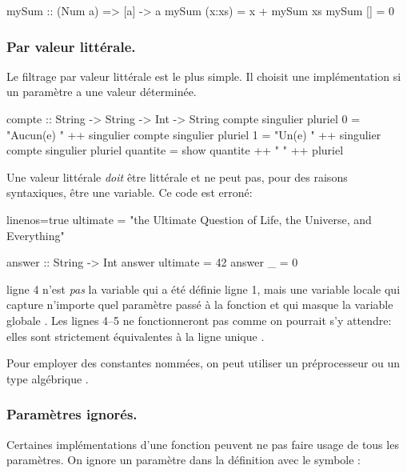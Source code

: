 \begin{haskellcode}
mySum :: (Num a) => [a] -> a
mySum (x:xs) = x + mySum xs
mySum []     = 0
\end{haskellcode}

\subsubsection{Par valeur littérale.}

Le filtrage par valeur littérale est le plus simple. Il choisit une implémentation si un paramètre a une valeur déterminée.

\begin{haskellcode}
compte :: String -> String -> Int -> String
compte singulier pluriel 0 = "Aucun(e) " ++ singulier
compte singulier pluriel 1 = "Un(e) " ++ singulier
compte singulier pluriel quantite = show quantite ++ " " ++  pluriel
\end{haskellcode}

\begin{warnbox}
Une valeur littérale \emph{doit} être littérale et ne peut pas, pour des raisons syntaxiques, être une variable. Ce code est erroné:

\begin{haskellcode*}{linenos=true}
ultimate = "the Ultimate Question of Life, the Universe, and Everything"

answer :: String -> Int
answer ultimate = 42
answer _ = 0
\end{haskellcode*}

 ligne 4 n'est \emph{pas} la variable qui a été définie ligne 1, mais une variable locale qui capture n'importe quel paramètre passé à la fonction et qui masque la variable globale . Les lignes 4--5 ne fonctionneront pas comme on pourrait s'y attendre: elles sont strictement équivalentes à la ligne unique .

Pour employer des constantes nommées, on peut utiliser un préprocesseur  ou un type algébrique .
\end{warnbox}

\subsubsection{Paramètres ignorés.}

Certaines implémentations d'une fonction peuvent ne pas faire usage de tous les paramètres. On ignore un paramètre dans la définition avec le symbole \hs{_}:

